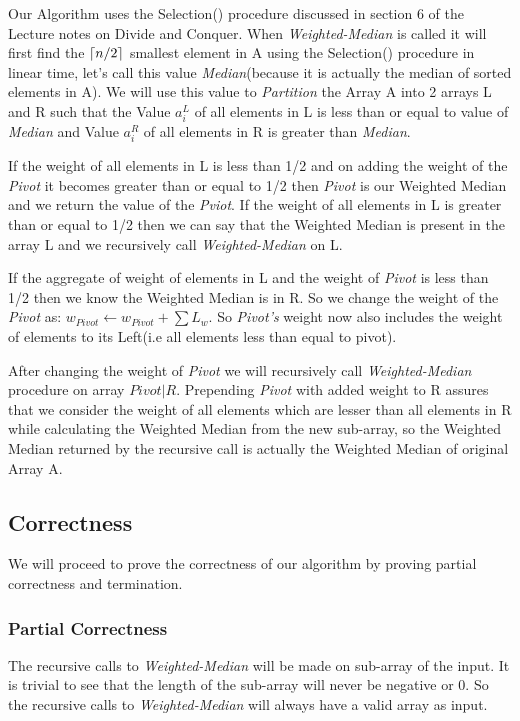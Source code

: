 \documentclass[8pt]{article}
\DeclarePairedDelimiter\ceil{\lceil}{\rceil}
\begin{document}
\begin{flushleft}
Our Algorithm uses the Selection() procedure discussed in section 6 of the Lecture 
notes on Divide and Conquer. When \textit{Weighted-Median} is called it will first
find the $\ceil{n/2}$ smallest element in A using the Selection() procedure in linear
time, let's call this value \textit{Median}(because it is actually the median of
sorted elements in A). We will use this value to \textit{Partition} the Array A into
2 arrays L and R such that the Value $a_i^L$ of all elements in L is less than or equal
to value of \textit{Median} and Value $a_i^R$ of all elements in R is greater than \textit{Median}.

If the weight of all elements in L is less than 1/2 and on adding the weight of the \textit{Pivot}
it becomes greater than or equal to 1/2 then \textit{Pivot} is our Weighted Median and
we return the value of the \textit{Pviot}. If the weight of all elements in L is greater
than or equal to 1/2 then we can say that the Weighted Median is present in the array L
and we recursively call \textit{Weighted-Median} on L.

If the aggregate of weight of elements in L and the weight of \textit{Pivot} is less than 1/2
then we know the Weighted Median is in R. So we change the weight of the
\textit{Pivot} as: $w_{Pivot} \leftarrow w_{Pivot} + \sum L_w$. So \textit{Pivot's} weight
now also includes the weight of elements to its Left(i.e all elements less than equal to pivot).

After changing the weight of \textit{Pivot} we will recursively call \textit{Weighted-Median}
procedure on array $\textit{Pivot}|R$. Prepending \textit{Pivot} with added weight to R
assures that we consider the weight of all elements which are lesser than all elements in R
while calculating the Weighted Median from the new sub-array, so the Weighted Median returned by the recursive call is actually the Weighted Median of original Array A.

\newpage
\subsection{Correctness}
We will proceed to prove the correctness of our algorithm by proving partial correctness
and termination.

\subsubsection{Partial Correctness}
The recursive calls to \textit{Weighted-Median} will be made on sub-array of the input.
It is trivial to see that the length of the sub-array will never be negative or 0. So
the recursive calls to \textit{Weighted-Median} will always have a valid array as input.


\end{flushleft}
\end{document}
